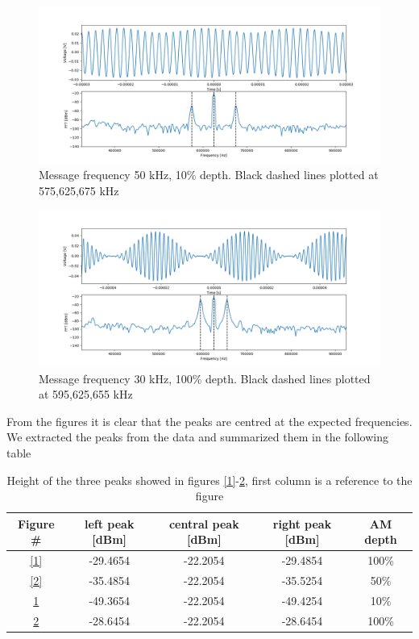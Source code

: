 \documentclass[a4paper,10pt]{article}
\begin{document}
\begin{figure}[H]
\centering
\includegraphics[width=\textwidth]{amp3}
\caption{Message frequency 50 kHz, 10\% depth. Black dashed lines plotted at 575,625,675 kHz}\label{3}
\end{figure}
\begin{figure}[H]
\centering
\includegraphics[width=\textwidth]{amp4}
\caption{Message frequency 30 kHz, 100\% depth. Black dashed lines plotted at 595,625,655 kHz}\label{4}
\end{figure}
From the figures it is clear that the peaks are centred at the expected frequencies. We extracted the peaks from the data and summarized them in the following table
\begin{table}[H]
\centering
\begin{tabular}{c|c|c|c|c}
 Figure \# & left peak [dBm] & central peak [dBm]& right peak [dBm]& AM depth\\
  \hline
  \ref{1} & -29.4654 & -22.2054 & -29.4854 & 100\%\\
  \hline
  \ref{2} & -35.4854 & -22.2054 & -35.5254 & 50\%\\
  \hline
  \ref{3} & -49.3654 & -22.2054 & -49.4254 & 10\%\\
  \hline
  \ref{4} & -28.6454 & -22.2054 & -28.6454 & 100\%\\
  \hline
\end{tabular}
\caption{Height of the three peaks showed in figures \ref{1}-\ref{4}, first column is a reference to the figure}
\end{table}
\end{document}
